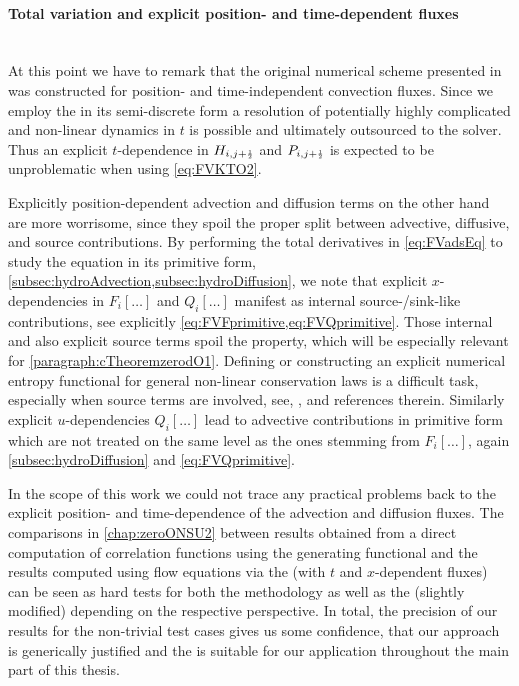 \paragraph{Total variation and explicit position- and time-dependent fluxes}\label{paragraph:KTxdep}\mbox{} \\
At this point we have to remark that the original \kt{} numerical scheme presented in  was constructed for position- and time-independent convection fluxes.
Since we employ the \ktScheme{} in its semi-discrete form a resolution of potentially highly complicated and non-linear dynamics in $t$ is possible and ultimately outsourced to the \ode{} solver.
Thus an explicit $t$-dependence in $H_{i,j + \ttfrac{1}{2}}$ and $P_{i,j + \ttfrac{1}{2}}$ is expected to be unproblematic when using \cref{eq:FVKTO2}.

Explicitly position-dependent advection and diffusion terms on the other hand are more worrisome, since they spoil the proper split between advective, diffusive, and source contributions.
By performing the total derivatives in \eqref{eq:FVadsEq} to study the equation in its primitive form, \cf{} \cref{subsec:hydroAdvection,subsec:hydroDiffusion}, we note that explicit $x$-dependencies in $F_i[\ldots]$ and $Q_i[\ldots]$ manifest as internal source-/sink-like contributions, see explicitly \cref{eq:FVFprimitive,eq:FVQprimitive}.
Those internal and also explicit source terms spoil the \tvni{} property, which will be especially relevant for \cref{paragraph:cTheoremzerodO1}.
Defining or constructing an explicit numerical entropy functional for general non-linear conservation laws is a difficult task, especially when source terms are involved, see, \eg{},  and references therein. 
Similarly explicit $u$-dependencies $Q_i[\ldots]$ lead to advective contributions in primitive form which are not treated on the same level as the ones stemming from $F_i[\ldots]$, \cf{} again \cref{subsec:hydroDiffusion} and \cref{eq:FVQprimitive}. 

In the scope of this work we could not trace any practical problems back to the explicit position- and time-dependence of the advection and diffusion fluxes.
The comparisons in \cref{chap:zeroONSU2} between results obtained from a direct computation of correlation functions using the generating functional and the results computed using \frg{} flow equations via the \ktScheme{} (with $t$ and $x$-dependent fluxes) can be seen as hard tests for both \dash{} the \frg{} methodology as well as the (slightly modified) \ktScheme{} \dash{} depending on the respective perspective. 
In total, the precision of our results for the non-trivial test cases gives us some confidence, that our approach is generically justified and the \ktScheme{} is suitable for our application throughout the main part of this thesis.

